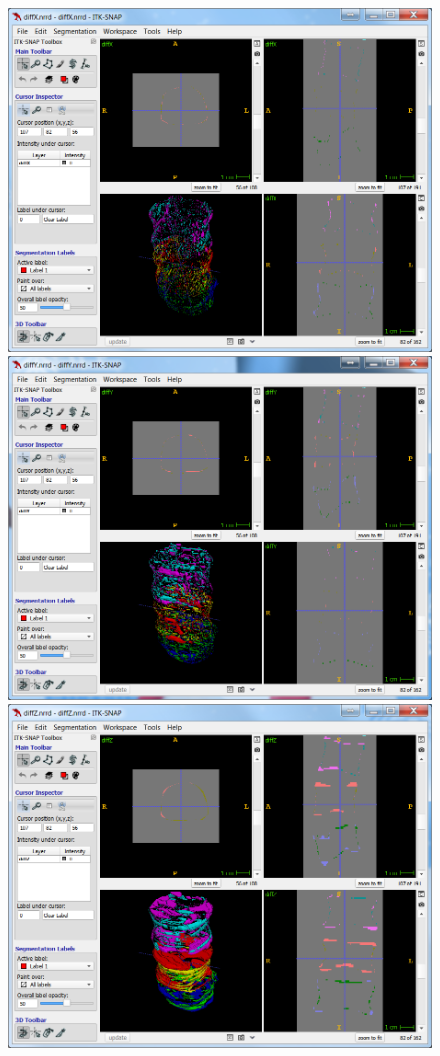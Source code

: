 \documentclass{InsightArticle}
\begin{document}
\begin{figure}[htbp]
\center
\includegraphics[scale=0.42]{diffX.png}
\includegraphics[scale=0.42]{diffY.png}
\includegraphics[scale=0.42]{diffZ.png}

\end{figure}
\end{document}
